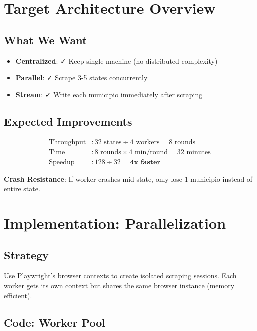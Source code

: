 \documentclass[11pt,a4paper]{article}
\begin{document}
\section{Target Architecture Overview}

\subsection{What We Want}

\begin{itemize}[leftmargin=*]
    \item \textbf{Centralized}: ✓ Keep single machine (no distributed complexity)
    \item \textbf{Parallel}: ✓ Scrape 3-5 states concurrently
    \item \textbf{Stream}: ✓ Write each municipio immediately after scraping
\end{itemize}

\subsection{Expected Improvements}

\begin{align*}
\text{Throughput} &: 32 \text{ states} \div 4 \text{ workers} = 8 \text{ rounds} \\
\text{Time} &: 8 \text{ rounds} \times 4 \text{ min/round} = 32 \text{ minutes} \\
\text{Speedup} &: 128 \div 32 = \mathbf{4x \text{ faster}}
\end{align*}

\textbf{Crash Resistance}: If worker crashes mid-state, only lose 1 municipio instead of entire state.

\section{Implementation: Parallelization}

\subsection{Strategy}

Use Playwright's browser contexts to create isolated scraping sessions. Each worker gets its own context but shares the same browser instance (memory efficient).

\subsection{Code: Worker Pool}
\end{document}
